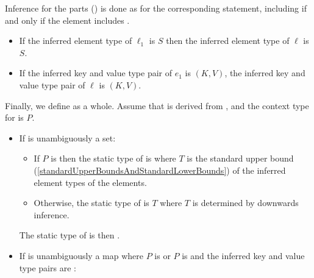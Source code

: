\documentclass[makeidx]{article}
\begin{document}
{

\LMHash{}%
Inference for the parts
()
is done as for the corresponding \FOR{} statement,
including \AWAIT{} if and only if the element includes \AWAIT.

\begin{itemize}
\item
  If the inferred element type of $\ell_1$ is $S$ then
  the inferred element type of $\ell$ is $S$.
\item
  If the inferred key and value type pair of $e_1$ is $(K, V)$,
  the inferred key and value type pair of $\ell$ is $(K, V)$.
\end{itemize}

\vspace{3mm}
\EndCase

\LMHash{}%
Finally, we define
as a whole.
%
Assume that  is derived from ,
and the context type for  is $P$.

\begin{itemize}
\item
  If  is unambiguously a set:

  \begin{itemize}
  \item
    If $P$ is \FreeContext{} then
    the static type of  is 
    where $T$ is the standard upper bound
    (\ref{standardUpperBoundsAndStandardLowerBounds})
    of the inferred element types of the elements.
  \item
    Otherwise, the static type of  is $T$
    where $T$ is determined by downwards inference.

  \end{itemize}

  The static type of  is then .
\item
  If  is unambiguously a map
  where $P$ is  or $P$ is \FreeContext{}
  and the inferred key and value type pairs are
  :


\end{itemize}}
\end{document}
